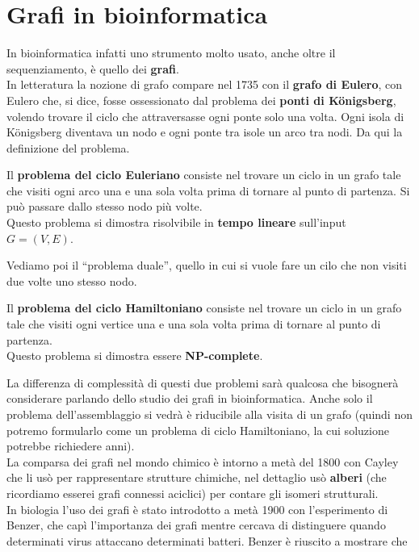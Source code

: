 \documentclass[a4paper,12pt, oneside]{book}
\begin{document}
\section{Grafi in bioinformatica}
In bioinformatica infatti uno strumento molto usato, anche oltre il
sequenziamento, è quello dei \textbf{grafi}.\\
In letteratura la nozione di grafo compare nel 1735 con il \textbf{grafo di
  Eulero}, con Eulero che, si dice, fosse ossessionato dal problema dei
\textbf{ponti di K\"{o}nigsberg}, volendo trovare il ciclo che attraversasse
ogni ponte solo una volta. Ogni isola di K\"{o}nigsberg diventava un nodo e ogni
ponte tra isole un arco tra nodi. Da qui la definizione del problema.
\begin{definizione}
  Il  \textbf{problema del ciclo Euleriano} consiste nel trovare un ciclo in un
  grafo tale che visiti ogni arco una e una sola volta prima di tornare al punto
  di partenza. Si può passare dallo stesso nodo più volte.\\
  Questo problema si dimostra risolvibile in \textbf{tempo lineare} sull'input
  $G=(V,E)$. 
\end{definizione}
Vediamo poi il ``problema duale'', quello in cui si vuole fare un cilo che non
visiti due volte uno stesso nodo.
\begin{definizione}
  Il  \textbf{problema del ciclo Hamiltoniano} consiste nel trovare un ciclo in un
  grafo tale che visiti ogni vertice una e una sola volta prima di tornare al punto
  di partenza.\\
  Questo problema si dimostra essere \textbf{NP-complete}.
\end{definizione}
La differenza di complessità di questi due problemi sarà qualcosa che bisognerà
considerare parlando dello studio dei grafi in bioinformatica. Anche solo il
problema dell'assemblaggio si vedrà è riducibile alla visita di un grafo (quindi
non potremo formularlo come un problema di ciclo Hamiltoniano, la cui soluzione
potrebbe richiedere anni).\\
La comparsa dei grafi nel mondo chimico è intorno a metà del 1800 con Cayley che
li usò per rappresentare strutture chimiche, nel dettaglio usò \textbf{alberi}
(che ricordiamo esserei grafi connessi aciclici) per contare gli isomeri
strutturali.\\
In biologia l'uso dei grafi è stato introdotto a metà 1900 con l'esperimento di
Benzer, che capì l'importanza dei grafi mentre cercava di distinguere quando
determinati virus attaccano determinati batteri. Benzer è riuscito a mostrare che
\end{document}
